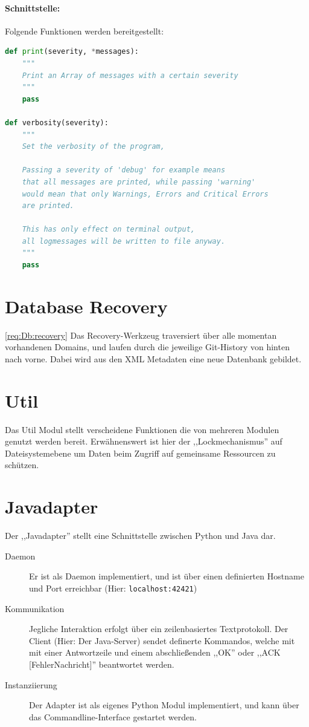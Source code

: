 \paragraph{Schnittstelle:}
\label{par:schnittstelle_}

Folgende Funktionen werden bereitgestellt:
\begin{lstlisting}[language=python]
def print(severity, *messages):
    """
    Print an Array of messages with a certain severity
    """
    pass

def verbosity(severity):
    """
    Set the verbosity of the program, 

    Passing a severity of 'debug' for example means
    that all messages are printed, while passing 'warning'
    would mean that only Warnings, Errors and Critical Errors 
    are printed.

    This has only effect on terminal output,
    all logmessages will be written to file anyway.
    """
    pass
\end{lstlisting}

\section{Database Recovery} 
\label{sec:database_recovery}
\ref{req:Db:recovery}
Das Recovery-Werkzeug traversiert über alle momentan vorhandenen Domains, und laufen durch die
jeweilige Git-History von hinten nach vorne. Dabei wird aus den XML Metadaten eine neue Datenbank gebildet.

\section{Util} 
\label{sec:util}
Das Util Modul stellt verscheidene Funktionen die von mehreren Modulen genutzt werden bereit.
Erwähnenswert ist hier der ,,Lockmechanismus''
auf Dateisystemebene um Daten beim Zugriff auf gemeinsame  Ressourcen zu schützen.

\section{Javadapter} 
\label{sec:javadapter}
Der ,,Javadapter'' stellt eine Schnittstelle zwischen Python und Java dar.
\begin{description}
  \item [Daemon] Er ist als Daemon implementiert, und ist über einen
    definierten Hostname und Port erreichbar (Hier: \texttt{localhost:42421})
  \item [Kommunikation] Jegliche Interaktion erfolgt über ein
    zeilenbasiertes Textprotokoll. Der Client (Hier: Der Java-Server)
    sendet definerte Kommandos, welche mit mit einer Antwortzeile
    und einem abschließenden ,,OK'' oder ,,ACK [FehlerNachricht]''
    beantwortet werden.
  \item [Instanziierung] Der Adapter ist als eigenes Python Modul
    implementiert, und kann über das Commandline-Interface gestartet
    werden.
\end{description}
 
